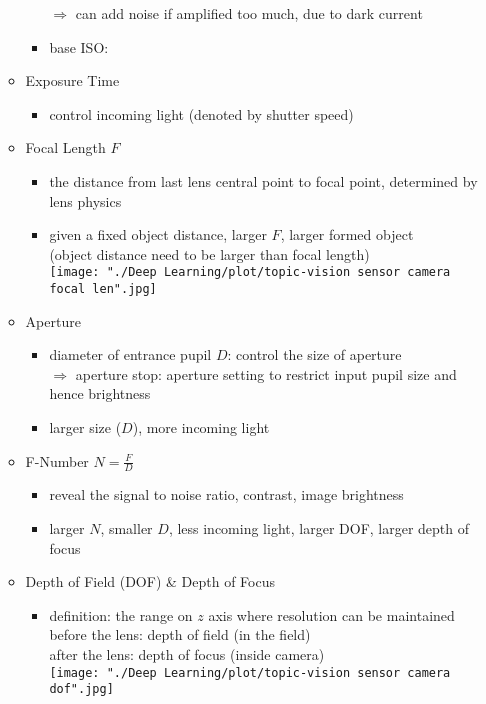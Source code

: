 \begin{itemize}
\begin{itemize}
\begin{itemize}
		$\Rightarrow$ can add noise if amplified too much, due to dark current
		\item base ISO: 
		\end{itemize}
	\item Exposure Time
		\begin{itemize}
		\item control incoming light (denoted by shutter speed)
		\end{itemize}
	\item Focal Length $F$
		\begin{itemize}
		\item the distance from last lens central point to focal point, determined by lens physics
		\item given a fixed object distance, larger $F$, larger formed object \\
		(object distance need to be larger than focal length) \\
		\texttt{[image: "./Deep Learning/plot/topic-vision sensor camera focal len".jpg]}
		\end{itemize}
	\item Aperture
		\begin{itemize}
		\item diameter of entrance pupil $D$: control the size of aperture \\
		$\Rightarrow$ aperture stop: aperture setting to restrict input pupil size and hence brightness
		\item larger size ($D$), more incoming light
		\end{itemize}
	\item F-Number $N = \frac F D$
		\begin{itemize}
		\item reveal the signal to noise ratio, contrast, image brightness
		\item larger $N$, smaller $D$, less incoming light, larger DOF, larger depth of focus
		\end{itemize}
	\item Depth of Field (DOF) \& Depth of Focus
		\begin{itemize}
		\item definition: the range on $z$ axis where resolution can be maintained \\
		before the lens: depth of field (in the field) \\
		after the lens: depth of focus (inside camera) \\
		\texttt{[image: "./Deep Learning/plot/topic-vision sensor  camera dof".jpg]}		

\end{itemize}
\end{itemize}
\end{itemize}
